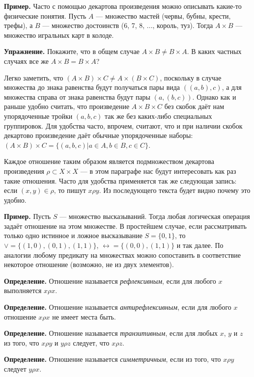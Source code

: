 {\bfseries Пример.} Часто с помощью декартова произведения можно описывать какие-то физические понятия. Пусть $A$ — множество мастей (червы, бубны, крести, трефы), а $B$ — множество достоинств (6, 7, 8, ..., король, туз). Тогда $A \times B$ — множество игральных карт в колоде.

{\bfseries Упражнение.} Покажите, что в общем случае $A\times B \not = B \times A$. В каких частных случаях все же $A\times B = B \times A$?

Легко заметить, что $(A\times B)\times C \not= A\times (B \times C)$, поскольку в случае множества до знака равенства будут получаться пары вида $((a, b), c)$, а для множества справа от знака равенства будут пары $(a, (b, c))$. Однако как и раньше удобно считать, что произведение $A\times B\times C$ без скобок даёт нам упорядоченные тройки $(a, b, c)$ так же без каких-либо специальных группировок. Для удобства часто, впрочем, считают, что и при наличии скобок декартово произведение даёт обычные упорядоченные наборы: $(A\times B)\times C = \{(a, b, c)|a\in A, b\in B, c\in C\}$.

Каждое отношение таким образом является подмножеством декартова произведения $\rho \subset X\times X$ — в этом параграфе нас будут интересовать как раз такие отношения. Часто для удобства применяется так же следующая запись: если $(x, y) \in \rho$, то пишут $x\rho y$. Из последующего текста будет видно почему это удобно.

{\bfseries Пример.} Пусть $S$ — множество высказываний. Тогда любая логическая операция задаёт отношение на этом множестве. В простейшем случае, если рассматривать только одно истинное и ложное высказывание $S = \{0, 1\}$, то $\vee = \{(1, 0), (0, 1), (1, 1)\}$, $\leftrightarrow = \{(0, 0), (1, 1)\}$ и так далее. По аналогии любому предикату на множествах можно сопоставить в соответствие некоторое отношение (возможно, не из двух элементов).

{\bfseries Определение.} Отношение называется {\slshape рефлексивным}, если для любого $x$ выполняется $x\rho x$.

{\bfseries Определение.} Отношение называется {\slshape антирефлексивным}, если для любого $x$ отношение $x\rho x$ не имеет места быть.

{\bfseries Определение.} Отношение называется {\slshape транзитивным}, если для любых $x$, $y$ и $z$ из того, что $x\rho y$ и $y \rho z$ следует, что $x\rho z$.

{\bfseries Определение.} Отношение называется {\slshape симметричным}, если из того, что $x\rho y$ следует $y\rho x$.

